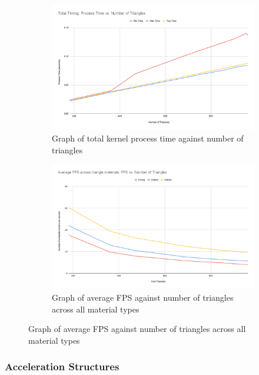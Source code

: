 \documentclass[final]{cmpreport}
\begin{document}
\begin{figure}
    \centering
    \begin{subfigure}{0.5\textwidth}
        \centering
        \includegraphics[width=0.9\linewidth]{img/Total Timing Process Time vs. Number of Triangles.png}
        \caption{Graph of total kernel process time against number of triangles}
        \label{graphtotaltri}
    \end{subfigure}%
    \begin{subfigure}{0.5\textwidth}
        \centering
        \includegraphics[width=0.9\linewidth]{img/Average FPS across triangle materials FPS vs. Number of Triangles.png}
        \caption{Graph of average FPS against number of triangles across all material types}
        \label{graphfpstri}
    \end{subfigure}
\end{figure}

\subsubsection{Acceleration Structures}
\end{document}
